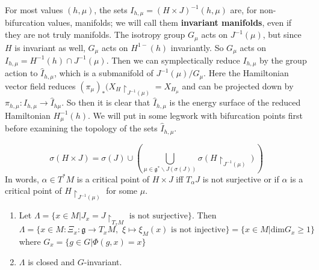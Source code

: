 For most values $(h,\mu)$, the sets $I_{h,\mu} = (H \times J)^{-1}(h,\mu)$ are, for non-bifurcation values, manifolds; we will call them \textbf{invariant manifolds}, even if they are not truly manifolds. The isotropy group $G_{\mu}$ acts on $J^{-1}(\mu)$, but since $H$ is invariant as well, $G_{\mu}$ acts on $H^{1-}(h)$ invariantly. So $G_{\mu}$ acts on $I_{h,\mu}=H^{-1}(h) \cap J^{-1}(\mu)$. Then we can symplectically reduce $I_{h,\mu}$ by the group action to $\widehat{I}_{h,\mu}$, which is a submanifold of $J^{-1}(\mu)/G_{\mu}$. Here the Hamiltonian vector field reduces $(\pi_{\mu})_*(X_H \restriction_{J^{-1}(\mu)} =  X_{H_{\mu}}$ and can be projected down by $\pi_{h,\mu}:I_{h,\mu} \to \widehat{I}_{h\mu}$. So then it is clear that $\widehat{I}_{h,\mu}$ is the energy surface of the reduced Hamiltonian $H_{\mu}^{-1}(h)$. We will put in some legwork with bifurcation points first before examining the topology of the sets $\widehat{I}_{h,\mu}$.

\begin{prop}

\begin{equation}
    \sigma(H \times J) = \sigma(J) \cup \left( \bigcup_{\mu \in \mathfrak{g}^*\backslash J(\sigma(J))} \sigma(H \restriction_{J^{-1}(\mu)}) \right)
\end{equation}
\indent In words, $\alpha \in T^*M$ is a critical point of $H \times J$ iff $T_{\alpha}J$ is not surjective or if $\alpha$ is a critical point of $H \restriction_{J^{-1}(\mu)}$ for some $\mu$.
\end{prop}

\begin{lem}
\begin{enumerate}
    \item Let $\Lambda = \{ x \in M \vert J_x = J \restriction_{T_x M} \text{ is not surjective} \}$. Then $\Lambda = \{ x \in M: \Xi_x: \mathfrak{g} \to T_x M, \hspace{4pt} \xi \mapsto \xi_M(x) \text{ is not injective} \} = \{ x \in M \vert \mathrm{dim}G_x \geq 1 \}$ where $G_x = \{g \in G \vert \Phi(g,x)=x \}$
    \item $\Lambda$ is closed and $G$-invariant.
\end{enumerate}
\end{lem}

